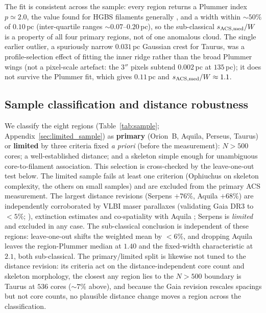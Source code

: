 \documentclass[usenatbib,twoside,twocolumn]{mnras}
\begin{document}
The fit is consistent across the sample: every region returns a Plummer index $p\simeq2.0$, the value found for HGBS filaments generally \citep{Arzoumanian2019}, and a width within $\sim50\%$ of $0.10$\,pc (inter-quartile ranges $\sim0.07$--$0.20$\,pc), so the sub-classical $s_{\rm ACS,med}/W$ is a property of all four primary regions, not of one anomalous cloud. The single earlier outlier, a spuriously narrow $0.031$\,pc Gaussian crest for Taurus, was a profile-selection effect of fitting the inner ridge rather than the broad Plummer wings (not a pixel-scale artefact: the $3''$ pixels subtend $0.002$\,pc at $135$\,pc); it does not survive the Plummer fit, which gives $0.11$\,pc and $s_{\rm ACS,med}/W\approx1.1$.

\subsection{Sample classification and distance robustness}
\label{sec:distance_uncertainties}

We classify the eight regions (Table~\ref{tab:sample}; Appendix~\ref{sec:limited_sample}) as \textbf{primary} (Orion~B, Aquila, Perseus, Taurus) or \textbf{limited} by three criteria fixed \emph{a priori} (before the measurement): $N>500$ cores; a well-established distance; and a skeleton simple enough for unambiguous core-to-filament association. This selection is cross-checked by the leave-one-out test below. The limited sample fails at least one criterion (Ophiuchus on skeleton complexity, the others on small samples) and are excluded from the primary ACS measurement. The largest distance revisions (Serpens $+76\%$, Aquila $+68\%$) are independently corroborated by VLBI maser parallaxes (validating Gaia DR3 to $<5\%$; \citealt{Kounkel2018,Xu2021,OrtizLeon2018,OrtizLeon2017}), extinction estimates \citep{Yan2022,Green2024} and co-spatiality with Aquila \citep{Zucker2020}; Serpens is \emph{limited} and excluded in any case. The sub-classical conclusion is independent of these regions: leave-one-out shifts the weighted mean by $<6\%$, and dropping Aquila leaves the region-Plummer median at $1.40$ and the fixed-width characteristic at $2.1$, both sub-classical. The primary/limited split is likewise not tuned to the distance revision: its criteria act on the distance-independent core count and skeleton morphology, the closest any region lies to the $N>500$ boundary is Taurus at $536$ cores ($\sim7\%$ above), and because the Gaia revision rescales spacings but not core counts, no plausible distance change moves a region across the classification.
\end{document}
